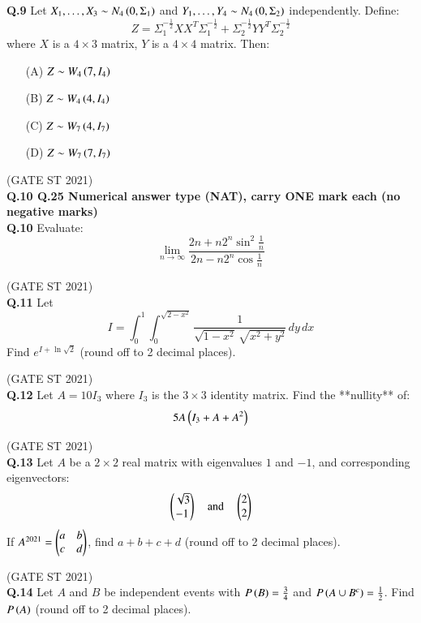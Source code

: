 \documentclass[journal,12pt,onecolumn]{IEEEtran}
\theoremstyle{remark}
\begin{document}
 

\textbf{Q.9}
Let $X_1,\dots,X_3 \sim N_4\left(0,\Sigma_1\right)$ and $Y_1,\dots,Y_4 \sim N_4\left(0,\Sigma_2\right)$ independently.  
Define:
\[
Z = \Sigma_1^{-\frac12}XX^T\Sigma_1^{-\frac12} + \Sigma_2^{-\frac12}YY^T\Sigma_2^{-\frac12}
\]
where $X$ is a $4\times 3$ matrix, $Y$ is a $4\times 4$ matrix.  
Then:
\begin{enumerate}
\item[(A)] $Z \sim W_4\left(7, I_4\right)$
\item[(B)] $Z \sim W_4\left(4, I_4\right)$
\item[(C)] $Z \sim W_7\left(4, I_7\right)$
\item[(D)] $Z \sim W_7\left(7, I_7\right)$
\end{enumerate}
\hfill (GATE ST 2021) \\

\textbf{Q.10 \text{-} Q.25 Numerical answer type (NAT), carry ONE mark each (no negative marks)} \\
 \textbf{Q.10}
Evaluate:
\[
\lim_{n \to \infty} \frac{2n + n 2^n \sin^2\frac{1}{n}}{2n - n 2^n \cos\frac{1}{n}}
\]

\hfill (GATE ST 2021) \\
\textbf{Q.11}
Let
\[
I = \int_{0}^{1} \int_{0}^{\sqrt{2 - x^2}} \frac{1}{\sqrt{1 - x^2} \, \sqrt{x^2 + y^2}} \, dy \, dx
\]
Find $e^{I + \ln{\sqrt{2}}}$ (round off to 2 decimal places).

\hfill (GATE ST 2021) \\

\textbf{Q.12}
Let $A = 10I_3$ where $I_3$ is the $3 \times 3$ identity matrix.  
Find the **nullity** of:
\[
5A \left(I_3 + A + A^2\right)
\]

\hfill (GATE ST 2021) \\

\textbf{Q.13}
Let $A$ be a $2 \times 2$ real matrix with eigenvalues $1$ and $-1$, and corresponding eigenvectors:
\[
\begin{pmatrix} \sqrt{3} \\ -1 \end{pmatrix}
\quad \text{and} \quad
\begin{pmatrix} 2 \\ 2 \end{pmatrix}
\]
If $A^{2021} = \begin{pmatrix} a & b \\ c & d \end{pmatrix}$,  
find $a+b+c+d$ (round off to 2 decimal places).

\hfill (GATE ST 2021) \\

\textbf{Q.14}
Let $A$ and $B$ be independent events with $P\left(B\right) = \frac{3}{4}$ and $P\left(A \cup B^c\right) = \frac12$.  
Find $P\left(A\right)$ (round off to 2 decimal places).
\end{document}
